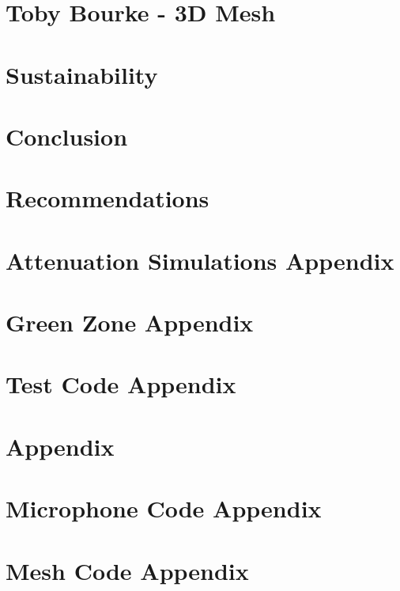 \documentclass[a4paper,12pt]{article}
\begin{document}
\pagebreak
\section{Toby Bourke - 3D Mesh}


\pagebreak
\section{Sustainability}


\pagebreak
\section{Conclusion}


\pagebreak
\section{Recommendations}


\pagebreak
{}



\pagebreak
\begin{appendices}

	\section{Attenuation Simulations Appendix}
	\label{AppendixA}
	
	
	\pagebreak
	\section{Green Zone Appendix}
	\label{AppendixB}
	
	
	\pagebreak
	\section{Test Code Appendix}
	\label{AppendixC}
	


    \pagebreak
    \section{Appendix}
    \label{sec:l_append}
    
   
    
    \pagebreak
    \section{Microphone Code Appendix}
    \label{sec:bill_code_append}
        
    
    \pagebreak
    \section{Mesh Code Appendix}
    \label{sec:tob_code_append}
    
\end{appendices}
\end{document}
